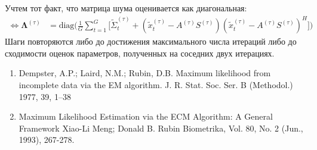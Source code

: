 \documentclass[11pt]{article}
\begin{document}
Учтем тот факт, что матрица шума оценивается как диагональная:
\begin{align*}
\iff \mathbf{\Lambda}^{(\tau)}  &= \text{diag}\bigg(\frac{1}{G} \sum_{t = 1}^{G} \Big[ \widetilde{\Sigma}_{t}^{(\tau)} +  (\widetilde{x}_t^{(\tau)}- A^{(\tau)}S^{(\tau)}) (\widetilde{x}_t^{(\tau)}- A^{(\tau)}S^{(\tau)})^H \Big]\bigg)
\end{align*}
Шаги повторяются либо до достижения максимального числа итераций либо до сходимости оценок параметров, полученных на соседних двух итерациях.
\begin{center}
\fontsize{16}{20}\selectfont {}
\end{center}
\begin{enumerate}
\item
Dempster, A.P.; Laird, N.M.; Rubin, D.B. Maximum likelihood from incomplete data via the EM algorithm. J. R. Stat. Soc. Ser. B
(Methodol.) 1977, 39, 1–38
\item
Maximum Likelihood Estimation via the ECM Algorithm: A General Framework Xiao-Li Meng; Donald B. Rubin Biometrika, Vol. 80, No. 2 (Jun., 1993), 267-278.
\end{enumerate}
\end{document}
